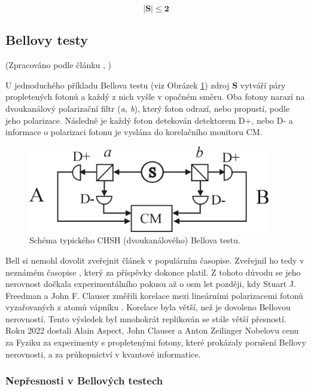 \begin{equation}
    \bm{|S| \leq 2}
    \label{eq:6}
\end{equation}

\clearpage

\subsection{Bellovy testy}
(Zpracováno podle článku , \cite*{belltest})

U jednoduchého příkladu Bellova testu (viz Obrázek \ref{fig:6}) zdroj \textbf{S} vytváří páry propletených fotonů a každý z nich vyšle v opačném směru. Oba fotony narazí na dvoukanálový polarizační filtr (\emph{a, b}), který foton odrazí, nebo propustí, podle jeho polarizace. Následně je každý foton detekován detektorem D+, nebo D- a informace o polarizaci fotonu je vyslána do korelačního monitoru CM.

\begin{figure}[ht]
    \centering
    \includegraphics[width=300pt]{images/Two_channel.png}
    \caption{\label{fig:6}Schéma typického CHSH (dvoukanálového) Bellova testu.}
\end{figure}

Bell si nemohl dovolit zveřejnit článek v populárním časopise. Zveřejnil ho tedy v neznámém časopise , který za příspěvky dokonce platil. Z tohoto důvodu se jeho nerovnost dočkala experimentálního pokusu až o osm let později, kdy Stuart J. Freedman a John F. Clauser změřili korelace mezi lineárními polarizacemi fotonů vyzařovaných z atomů vápníku \parencite*{belltest:1}. Korelace byla větší, než je dovoleno Bellovou nerovností. Tento výsledek byl mnohokrát replikován se stále větší přesností. Roku 2022 dostali Alain Aspect, John Clauser a Anton Zeilinger Nobelovu cenu za Fyziku za experimenty s propletenými fotony, které prokázaly porušení Bellovy nerovnosti, a za průkopnictví v kvantové informatice.

\subsubsection{Nepřesnosti v Bellových testech}

